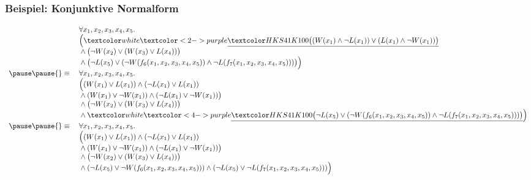 \documentclass[aspectratio=1610,onlymath]{beamer}
\begin{document}
\begin{frame}\frametitle{Beispiel: Konjunktive Normalform}

\footnotesize
\[\begin{array}{rl}
& \forall x_1,x_2,x_3,x_4,x_5.\\
& \Big(\hi{2-}{\big((W(x_1)\wedge\neg L(x_1))\vee (L(x_1)\wedge\neg W(x_1))\big)}\\
& {}\wedge{}  \big(\neg W(x_2)\vee(W(x_3) \vee L(x_4))\big)\\
& {}\wedge{}  \big(\neg L(x_5)\vee(\neg W(f_6(x_1,x_2,x_3,x_4,x_5)) \wedge \neg L(f_7(x_1,x_2,x_3,x_4,x_5)))\big)\Big)\\\pause\pause
{}\equiv{} & \forall x_1,x_2,x_3,x_4,x_5.\\
& \Big((W(x_1)\vee L(x_1))\wedge(\neg L(x_1)\vee L(x_1))\\
& {}\wedge (W(x_1)\vee \neg W(x_1))\wedge(\neg L(x_1)\vee \neg W(x_1))\big)\\
& {}\wedge{}  \big(\neg W(x_2)\vee(W(x_3) \vee L(x_4))\big)\\
& {}\wedge{}  \hi{4-}{\big(\neg L(x_5)\vee(\neg W(f_6(x_1,x_2,x_3,x_4,x_5)) \wedge \neg L(f_7(x_1,x_2,x_3,x_4,x_5)))\big)}\Big)\\\pause\pause
{}\equiv{} & \forall x_1,x_2,x_3,x_4,x_5.\\
& \Big((W(x_1)\vee L(x_1))\wedge(\neg L(x_1)\vee L(x_1))\\
& {}\wedge (W(x_1)\vee \neg W(x_1))\wedge(\neg L(x_1)\vee \neg W(x_1))\big)\\
& {}\wedge{}  \big(\neg W(x_2)\vee(W(x_3) \vee L(x_4))\big)\\
& {}\wedge{}  (\neg L(x_5)\vee\neg W(f_6(x_1,x_2,x_3,x_4,x_5))) \wedge (\neg L(x_5)\vee\neg L(f_7(x_1,x_2,x_3,x_4,x_5)))\Big)
\end{array}
\]


\end{frame}
\end{document}
